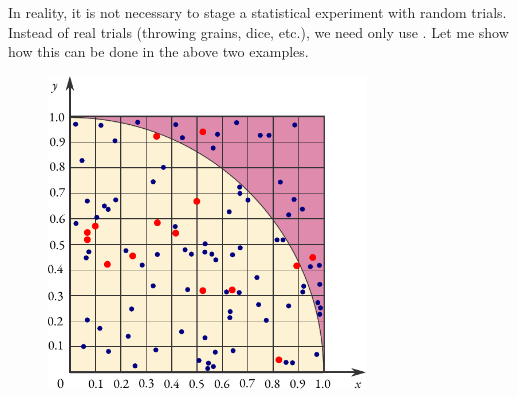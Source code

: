 In reality, it is not necessary to stage a statistical experiment with
random trials. Instead of real trials (throwing grains, dice, etc.), we need
only use . Let me show how this can be done in
the above two examples.
 \begin{figure}[!h]
 \centering
 \includegraphics[width=0.75\textwidth]{figures/monte-carlo2.pdf}
 \end{figure}
 
